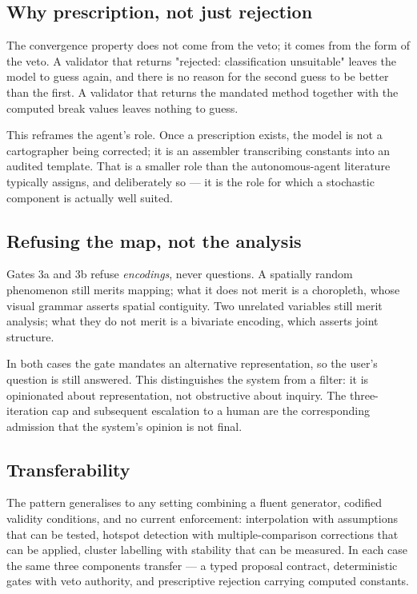 \subsection{Why prescription, not just rejection}
The convergence property does not come from the veto; it comes from the form of the veto. A validator that returns "rejected: classification unsuitable" leaves the model to guess again, and there is no reason for the second guess to be better than the first. A validator that returns the mandated method together with the computed break values leaves nothing to guess.

This reframes the agent's role. Once a prescription exists, the model is not a cartographer being corrected; it is an assembler transcribing constants into an audited template. That is a smaller role than the autonomous-agent literature typically assigns, and deliberately so --- it is the role for which a stochastic component is actually well suited.

\subsection{Refusing the map, not the analysis}
Gates 3a and 3b refuse \emph{encodings}, never questions. A spatially random phenomenon still merits mapping; what it does not merit is a choropleth, whose visual grammar asserts spatial contiguity. Two unrelated variables still merit analysis; what they do not merit is a bivariate encoding, which asserts joint structure.

In both cases the gate mandates an alternative representation, so the user's question is still answered. This distinguishes the system from a filter: it is opinionated about representation, not obstructive about inquiry. The three-iteration cap and subsequent escalation to a human are the corresponding admission that the system's opinion is not final.

\subsection{Transferability}
The pattern generalises to any setting combining a fluent generator, codified validity conditions, and no current enforcement: interpolation with assumptions that can be tested, hotspot detection with multiple-comparison corrections that can be applied, cluster labelling with stability that can be measured. In each case the same three components transfer --- a typed proposal contract, deterministic gates with veto authority, and prescriptive rejection carrying computed constants.

